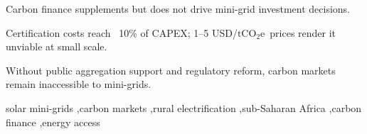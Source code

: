 \documentclass[preprint,12pt]{elsarticle}
\newcommand{\tcooe}{\ensuremath{\mathrm{tCO_2e}}}
\begin{document}
\begin{frontmatter}

\begin{highlights}
	\item Carbon finance supplements but does not drive mini-grid investment decisions.
	\item Certification costs reach ~10\% of CAPEX; 1--5 USD/\tcooe\ prices render it unviable at small scale.
	\item Without public aggregation support and regulatory reform, carbon markets remain inaccessible to mini-grids.
\end{highlights}

\begin{keyword}
	solar mini-grids \sep carbon markets \sep rural electrification \sep sub-Saharan Africa \sep carbon finance \sep energy access
\end{keyword}

\end{frontmatter}









\appendix







 

\end{document}
